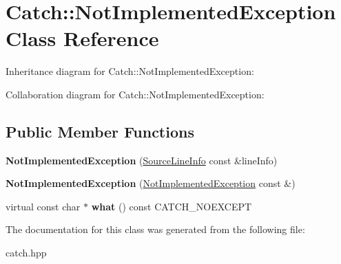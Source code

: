 \hypertarget{class_catch_1_1_not_implemented_exception}{}\section{Catch\+:\+:Not\+Implemented\+Exception Class Reference}
\label{class_catch_1_1_not_implemented_exception}


Inheritance diagram for Catch\+:\+:Not\+Implemented\+Exception\+:


Collaboration diagram for Catch\+:\+:Not\+Implemented\+Exception\+:
\subsection*{Public Member Functions}
\begin{DoxyCompactItemize}
\item 
\mbox{\label{class_catch_1_1_not_implemented_exception_ab4f0a5c39d8ffb72c664e2c07e180634}} 
{\bfseries Not\+Implemented\+Exception} (\hyperlink{struct_catch_1_1_source_line_info}{Source\+Line\+Info} const \&line\+Info)
\item 
\mbox{\label{class_catch_1_1_not_implemented_exception_a508a7a833455da2d3c10ea1a9d45e982}} 
{\bfseries Not\+Implemented\+Exception} (\hyperlink{class_catch_1_1_not_implemented_exception}{Not\+Implemented\+Exception} const \&)
\item 
\mbox{\label{class_catch_1_1_not_implemented_exception_ad4c13963f1a8feacda0cd331adda89e3}} 
virtual const char $\ast$ {\bfseries what} () const C\+A\+T\+C\+H\+\_\+\+N\+O\+E\+X\+C\+E\+PT
\end{DoxyCompactItemize}


The documentation for this class was generated from the following file\+:\begin{DoxyCompactItemize}
\item 
catch.\+hpp\end{DoxyCompactItemize}
